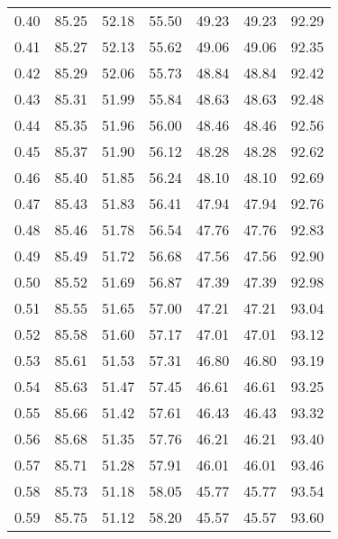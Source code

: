 \begin{tabular}{|c|c|c|c|c|c|c|}
      0.40 &     85.25 &     52.18 &      55.50 &   49.23 &      49.23 &         92.29 \\
      0.41 &     85.27 &     52.13 &      55.62 &   49.06 &      49.06 &         92.35 \\
      0.42 &     85.29 &     52.06 &      55.73 &   48.84 &      48.84 &         92.42 \\
      0.43 &     85.31 &     51.99 &      55.84 &   48.63 &      48.63 &         92.48 \\
      0.44 &     85.35 &     51.96 &      56.00 &   48.46 &      48.46 &         92.56 \\
      0.45 &     85.37 &     51.90 &      56.12 &   48.28 &      48.28 &         92.62 \\
      0.46 &     85.40 &     51.85 &      56.24 &   48.10 &      48.10 &         92.69 \\
      0.47 &     85.43 &     51.83 &      56.41 &   47.94 &      47.94 &         92.76 \\
      0.48 &     85.46 &     51.78 &      56.54 &   47.76 &      47.76 &         92.83 \\
      0.49 &     85.49 &     51.72 &      56.68 &   47.56 &      47.56 &         92.90 \\
      0.50 &     85.52 &     51.69 &      56.87 &   47.39 &      47.39 &         92.98 \\
      0.51 &     85.55 &     51.65 &      57.00 &   47.21 &      47.21 &         93.04 \\
      0.52 &     85.58 &     51.60 &      57.17 &   47.01 &      47.01 &         93.12 \\
      0.53 &     85.61 &     51.53 &      57.31 &   46.80 &      46.80 &         93.19 \\
      0.54 &     85.63 &     51.47 &      57.45 &   46.61 &      46.61 &         93.25 \\
      0.55 &     85.66 &     51.42 &      57.61 &   46.43 &      46.43 &         93.32 \\
      0.56 &     85.68 &     51.35 &      57.76 &   46.21 &      46.21 &         93.40 \\
      0.57 &     85.71 &     51.28 &      57.91 &   46.01 &      46.01 &         93.46 \\
      0.58 &     85.73 &     51.18 &      58.05 &   45.77 &      45.77 &         93.54 \\
      0.59 &     85.75 &     51.12 &      58.20 &   45.57 &      45.57 &         93.60 \\

\end{tabular}
